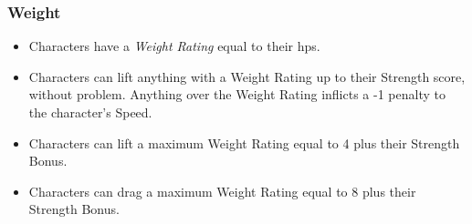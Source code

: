 \subsubsection*{Weight}

\begin{itemize}
  \item
  Characters have a \textit{Weight Rating} equal to their \glspl{hp}.
  \item
  Characters can lift anything with a Weight Rating up to their Strength score, without problem.
  Anything over the Weight Rating inflicts a -1 penalty to the character's Speed.
  \item
  Characters can lift a maximum Weight Rating equal to 4 plus their Strength Bonus.
  \item
  Characters can drag a maximum Weight Rating equal to 8 plus their Strength Bonus.
\end{itemize}
